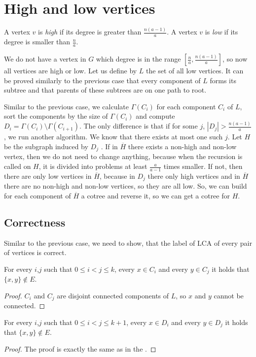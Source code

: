 \section{High and low vertices}
\label{high_and_low}
\begin{definition}
    A vertex $v$ is \emph{high} if its degree is greater than $\frac{n(a-1)}{a}$. A vertex $v$ is \emph{low} if its degree is smaller than $\frac{n}{a}$.
\end{definition}
We do not have a vertex in $G$ which degree is in the range $[\frac{n}{a}, \frac{n(a-1)}{a}]$, so now all vertices are high or low. Let us define by $L$ the set of all low vertices. It can be proved similarly to the previous case that every component of $L$ forms its subtree and that parents of these subtrees are on one path to root.

Similar to the previous case, we calculate $\Gamma(C_i)$ for each component $C_i$ of $L$, sort the components by the size of $\Gamma(C_i)$ and compute $D_i = \Gamma(C_i) \setminus \Gamma(C_{i+1})$. The only difference is that if for some $j$, $|D_j| > \frac{n(a-1)}{a}$, we run another algorithm. We know that there exists at most one such $j$. Let $H$ be the subgraph induced by $D_j$ . If in $\overline{H}$ there exists a non-high and non-low vertex, then we do not need to change anything, because when the recursion is called on $H$, it is divided into problems at least $\frac{a}{a-1}$ times smaller. If not, then there are only low vertices in $\overline{H}$, because in $D_j$ there only high vertices and in $\overline{H}$ there are no non-high and non-low vertices, so they are all low. So, we can build for each component of $\overline{H}$ a cotree and reverse it, so we can get a cotree for $H$.

\subsection{Correctness}
Similar to the previous case, we need to show, that the label of LCA of every pair of vertices is correct.
\begin{theorem}
    For every $i$,$j$ such that $0 \leq i < j \leq k$, every $x \in C_i$ and every $y \in C_j$ it holds that $\{x,y\} \notin E$. 
\end{theorem}
\begin{proof}
    $C_i$ and $C_j$ are disjoint connected components of $L$, so $x$ and $y$ cannot be connected.
\end{proof}


\begin{theorem}
    For every $i$,$j$ such that $0 \leq i < j \leq k + 1$, every $x \in D_i$ and every $y \in D_j$ it holds that $\{x,y\} \notin E$. 
\end{theorem}
\begin{proof}
    The proof is exactly the same as in the .
\end{proof}


